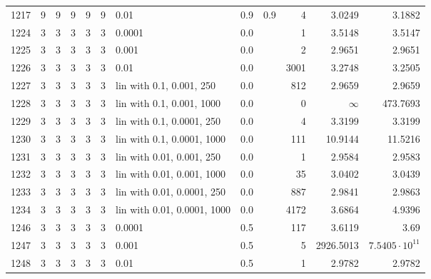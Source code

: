 \begin{longtable}{lrrrrrlrrrrr}
1217 &       9 & 9 & 9 & 9 & 9 &                        0.01 &  0.9 &    0.9 &       4 &                 3.0249 &                 3.1882 \\
1224 &       3 & 3 & 3 & 3 & 3 &                      0.0001 &  0.0 &        &       1 &                 3.5148 &                 3.5147 \\
1225 &       3 & 3 & 3 & 3 & 3 &                       0.001 &  0.0 &        &       2 &                 2.9651 &                 2.9651 \\
1226 &       3 & 3 & 3 & 3 & 3 &                        0.01 &  0.0 &        &    3001 &                 3.2748 &                 3.2505 \\
1227 &       3 & 3 & 3 & 3 & 3 &    lin with 0.1, 0.001, 250 &  0.0 &        &     812 &                 2.9659 &                 2.9659 \\
1228 &       3 & 3 & 3 & 3 & 3 &   lin with 0.1, 0.001, 1000 &  0.0 &        &       0 &               $\infty$ &               473.7693 \\
1229 &       3 & 3 & 3 & 3 & 3 &   lin with 0.1, 0.0001, 250 &  0.0 &        &       4 &                 3.3199 &                 3.3199 \\
1230 &       3 & 3 & 3 & 3 & 3 &  lin with 0.1, 0.0001, 1000 &  0.0 &        &     111 &                10.9144 &                11.5216 \\
1231 &       3 & 3 & 3 & 3 & 3 &   lin with 0.01, 0.001, 250 &  0.0 &        &       1 &                 2.9584 &                 2.9583 \\
1232 &       3 & 3 & 3 & 3 & 3 &  lin with 0.01, 0.001, 1000 &  0.0 &        &      35 &                 3.0402 &                 3.0439 \\
1233 &       3 & 3 & 3 & 3 & 3 &  lin with 0.01, 0.0001, 250 &  0.0 &        &     887 &                 2.9841 &                 2.9863 \\
1234 &       3 & 3 & 3 & 3 & 3 & lin with 0.01, 0.0001, 1000 &  0.0 &        &    4172 &                 3.6864 &                 4.9396 \\
1246 &       3 & 3 & 3 & 3 & 3 &                      0.0001 &  0.5 &        &     117 &                 3.6119 &                   3.69 \\
1247 &       3 & 3 & 3 & 3 & 3 &                       0.001 &  0.5 &        &       5 &              2926.5013 &  $7.5405\cdot 10^{11}$ \\
1248 &       3 & 3 & 3 & 3 & 3 &                        0.01 &  0.5 &        &       1 &                 2.9782 &                 2.9782 \\

\end{longtable}
